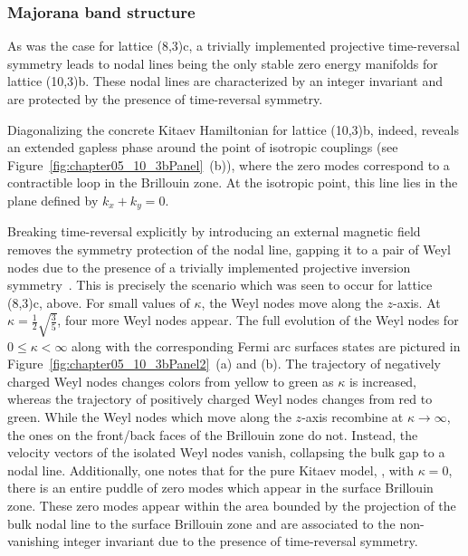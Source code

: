 %
%
\subsubsection{Majorana band structure}
%
%
As was the case for lattice (8,3)c, a trivially implemented projective time-reversal symmetry leads to nodal lines being the only stable zero energy manifolds for lattice (10,3)b.
These nodal lines are characterized by an integer invariant and are protected by the presence of time-reversal symmetry.

Diagonalizing the concrete Kitaev Hamiltonian for lattice (10,3)b, indeed, reveals an extended gapless phase around the point of isotropic couplings (see Figure~\ref{fig:chapter05_10_3bPanel}~(b)), where the zero modes correspond to a contractible loop in the Brillouin zone.
At the isotropic point, this line lies in the plane defined by $k_x + k_y = 0$.

Breaking time-reversal explicitly by introducing an external magnetic field removes the symmetry protection of the nodal line, gapping it to a pair of Weyl nodes due to the presence of a trivially implemented projective inversion symmetry~\cite{HermannsPRL2015}.
This is precisely the scenario which was seen to occur for lattice (8,3)c, above.
For small values of $\kappa$, the Weyl nodes move along the $z$-axis.
At $\kappa = \frac{1}{2} \sqrt{\frac{3}{5}}$, four more Weyl nodes appear.
The full evolution of the Weyl nodes for $0 \leq \kappa < \infty$ along with the corresponding Fermi arc surfaces states are pictured in Figure~\ref{fig:chapter05_10_3bPanel2}~(a) and (b).
The trajectory of negatively charged Weyl nodes changes colors from yellow to green as $\kappa$ is increased, whereas the trajectory of positively charged Weyl nodes changes from red to green.
While the Weyl nodes which move along the $z$-axis recombine at $\kappa \rightarrow \infty$, the ones on the front/back faces of the Brillouin zone do not.
Instead, the velocity vectors of the isolated Weyl nodes vanish, collapsing the bulk gap to a nodal line.
Additionally, one notes that for the pure Kitaev model, \ie, with $\kappa = 0$, there is an entire puddle of zero modes which appear in the surface Brillouin zone.
These zero modes appear within the area bounded by the projection of the bulk nodal line to the surface Brillouin zone and are associated to the non-vanishing integer invariant due to the presence of time-reversal symmetry.
\newpage


%
%
